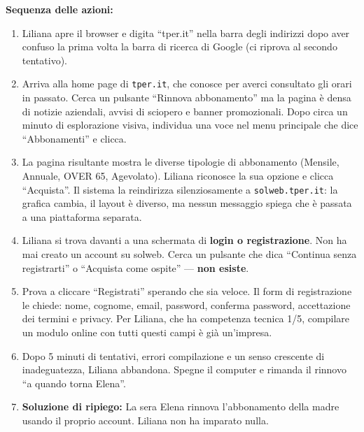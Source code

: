 \documentclass[11pt,a4paper]{article}
\begin{document}
\begin{tcolorbox}[colback=backgroundColor,colframe=borderColor,arc=2mm]
{    \textbf{Sequenza delle azioni:}
    \begin{enumerate}
        \item Liliana apre il browser e digita ``tper.it'' nella barra degli indirizzi dopo aver confuso la prima volta la barra di ricerca di Google (ci riprova al secondo tentativo).
        \item Arriva alla home page di \texttt{tper.it}, che conosce per averci consultato gli orari in passato. Cerca un pulsante ``Rinnova abbonamento'' ma la pagina è densa di notizie aziendali, avvisi di sciopero e banner promozionali. Dopo circa un minuto di esplorazione visiva, individua una voce nel menu principale che dice ``Abbonamenti'' e clicca.
        \item La pagina risultante mostra le diverse tipologie di abbonamento (Mensile, Annuale, OVER 65, Agevolato). Liliana riconosce la sua opzione e clicca ``Acquista''. Il sistema la reindirizza silenziosamente a \texttt{solweb.tper.it}: la grafica cambia, il layout è diverso, ma nessun messaggio spiega che è passata a una piattaforma separata.
        \item Liliana si trova davanti a una schermata di \textbf{login o registrazione}. Non ha mai creato un account su solweb. Cerca un pulsante che dica ``Continua senza registrarti'' o ``Acquista come ospite'' --- \textbf{non esiste}.
        \item Prova a cliccare ``Registrati'' sperando che sia veloce. Il form di registrazione le chiede: nome, cognome, email, password, conferma password, accettazione dei termini e privacy. Per Liliana, che ha competenza tecnica 1/5, compilare un modulo online con tutti questi campi è già un'impresa.
        \item Dopo 5 minuti di tentativi, errori compilazione e un senso crescente di inadeguatezza, Liliana abbandona. Spegne il computer e rimanda il rinnovo ``a quando torna Elena''.
        \item \textbf{Soluzione di ripiego:} La sera Elena rinnova l'abbonamento della madre usando il proprio account. Liliana non ha imparato nulla.
    \end{enumerate}

}
\end{tcolorbox}
\end{document}
